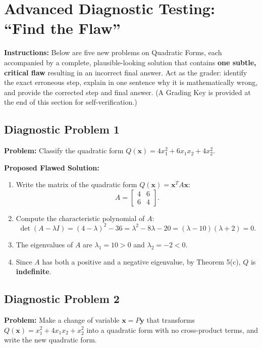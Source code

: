 \documentclass[11pt, letterpaper]{article}
\theoremstyle{definition}
\theoremstyle{remark}
\begin{document}
\section{Advanced Diagnostic Testing: ``Find the Flaw''}

\textbf{Instructions:} Below are five new problems on Quadratic Forms, each accompanied by a complete, plausible-looking solution that contains \textbf{one subtle, critical flaw} resulting in an incorrect final answer. Act as the grader: identify the exact erroneous step, explain in one sentence why it is mathematically wrong, and provide the corrected step and final answer. (A Grading Key is provided at the end of this section for self-verification.)

\subsection*{Diagnostic Problem 1}
\textbf{Problem:} Classify the quadratic form $Q(\mathbf{x}) = 4x_1^2 + 6x_1x_2 + 4x_2^2$.

\textbf{Proposed Flawed Solution:}
\begin{enumerate}
    \item Write the matrix of the quadratic form $Q(\mathbf{x}) = \mathbf{x}^T A \mathbf{x}$:
    \[
    A = \begin{bmatrix} 4 & 6 \\ 6 & 4 \end{bmatrix}.
    \]
    \item Compute the characteristic polynomial of $A$:
    \[
    \det(A - \lambda I) = (4 - \lambda)^2 - 36 = \lambda^2 - 8\lambda - 20 = (\lambda - 10)(\lambda + 2) = 0.
    \]
    \item The eigenvalues of $A$ are $\lambda_1 = 10 > 0$ and $\lambda_2 = -2 < 0$.
    \item Since $A$ has both a positive and a negative eigenvalue, by Theorem 5(c), $Q$ is \textbf{indefinite}.
\end{enumerate}

\hrulefill

\subsection*{Diagnostic Problem 2}
\textbf{Problem:} Make a change of variable $\mathbf{x} = P\mathbf{y}$ that transforms $Q(\mathbf{x}) = x_1^2 + 4x_1x_2 + x_2^2$ into a quadratic form with no cross-product terms, and write the new quadratic form.
\end{document}
